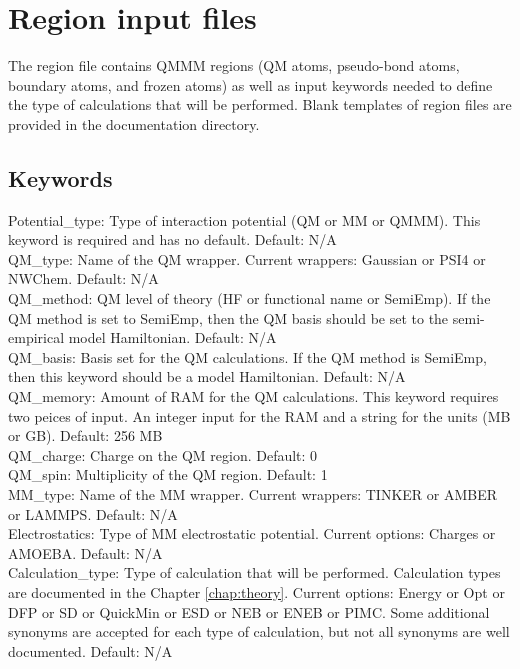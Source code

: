 \documentclass[12pt]{report}
\begin{document}
\section{Region input files}

The region file contains QMMM regions (QM atoms, pseudo-bond atoms, boundary
atoms, and frozen atoms) as well as input keywords needed to define the
type of calculations that will be performed.
Blank templates of region files are provided in the documentation
directory. \\

\subsection{Keywords}

Potential\_type: Type of interaction potential (QM or MM or QMMM).
This keyword is required and has no default.
Default: N/A \\

QM\_type: Name of the QM wrapper.
Current wrappers: Gaussian or PSI4 or NWChem.
Default: N/A \\

QM\_method: QM level of theory (HF or functional name or SemiEmp).
If the QM method is set to SemiEmp, then the QM basis should be set to the
semi-empirical model Hamiltonian.
Default: N/A \\

QM\_basis: Basis set for the QM calculations.
If the QM method is SemiEmp, then this keyword should be a model Hamiltonian.
Default: N/A \\

QM\_memory: Amount of RAM for the QM calculations.
This keyword requires two peices of input.
An integer input for the RAM and a string for the units (MB or GB).
Default: 256 MB \\

QM\_charge: Charge on the QM region.
Default: 0 \\

QM\_spin: Multiplicity of the QM region.
Default: 1 \\

MM\_type: Name of the MM wrapper.
Current wrappers: TINKER or AMBER or LAMMPS.
Default: N/A \\

Electrostatics: Type of MM electrostatic potential.
Current options: Charges or AMOEBA.
Default: N/A \\

Calculation\_type: Type of calculation that will be performed.
Calculation types are documented in the Chapter \ref{chap:theory}.
Current options: Energy or Opt or DFP or SD or QuickMin or ESD or NEB or
ENEB or PIMC.
Some additional synonyms are accepted for each type of calculation, but not
all synonyms are well documented.
Default: N/A \\
\end{document}

